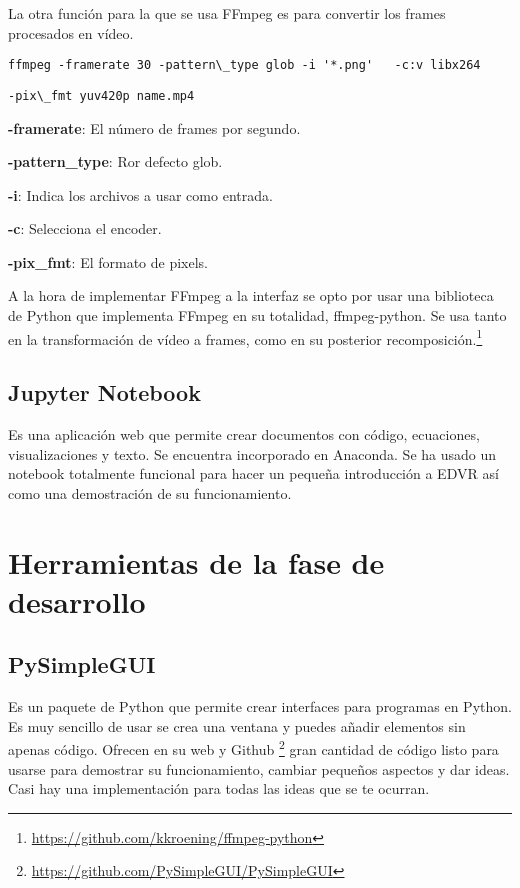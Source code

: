     La otra función para la que se usa FFmpeg es para convertir los frames procesados en vídeo.
    
    \verb|ffmpeg -framerate 30 -pattern\_type glob -i '*.png'   -c:v libx264|
    
    \verb|-pix\_fmt yuv420p name.mp4|
    
    \textbf{-framerate}: El número de frames por segundo.
    
    \textbf{-pattern\_type}: Ror defecto glob.
    
    \textbf{-i}: Indica los archivos a usar como entrada.
    
    \textbf{-c}: Selecciona el encoder.
    
    \textbf{-pix\_fmt}: El formato de pixels.
    
    A la hora de implementar FFmpeg a la interfaz se opto por usar una biblioteca de Python que implementa FFmpeg en su totalidad, ffmpeg-python. Se usa tanto en la transformación de vídeo a frames, como en su posterior recomposición.\footnote{\url{https://github.com/kkroening/ffmpeg-python}}
    

    \subsection{Jupyter Notebook}
    Es una aplicación web que permite crear documentos con código, ecuaciones, visualizaciones y texto.  Se encuentra incorporado en Anaconda. Se ha usado un notebook totalmente funcional para hacer un pequeña introducción a EDVR así como una demostración de su funcionamiento.


\section{Herramientas de la fase de desarrollo}

    \subsection{PySimpleGUI}
    Es un paquete de Python que permite  crear interfaces para programas en Python. Es muy sencillo de usar se crea una ventana y puedes añadir elementos sin apenas código. Ofrecen en su web y Github \footnote{\url{https://github.com/PySimpleGUI/PySimpleGUI}} gran cantidad de código listo para usarse para demostrar su funcionamiento, cambiar pequeños aspectos y dar ideas. Casi hay una implementación para todas las ideas que se te ocurran.
    
